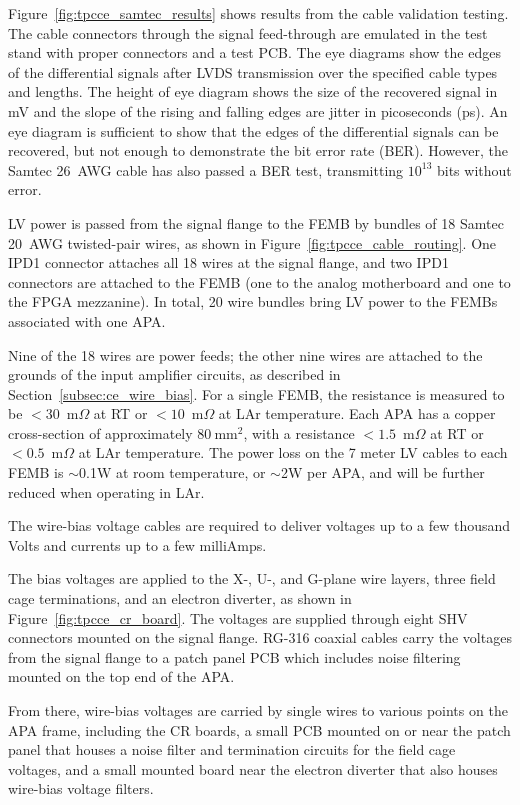 Figure~\ref{fig:tpcce_samtec_results} shows results from the cable 
validation testing. The cable connectors through the signal feed-through are emulated in the test stand with 
proper connectors and a test PCB. The eye diagrams show the edges of the differential signals after 
LVDS transmission over the specified cable types and lengths. The height of eye diagram shows the size 
of the recovered signal in mV and the slope of the rising and falling edges are jitter in picoseconds (ps). 
An eye diagram is sufficient to show that the edges of the differential signals can
be recovered, but not enough to demonstrate the bit error rate (BER). However, the Samtec 26~AWG cable has 
also passed a BER test, transmitting $10^{13}$ bits without error.

LV power is passed from the signal flange to the FEMB by bundles of 18 Samtec 
20~AWG twisted-pair wires, as shown in Figure~\ref{fig:tpcce_cable_routing}. One IPD1 connector
attaches all 18 wires at the signal flange, and two IPD1 connectors are attached to the FEMB (one to the
analog motherboard and one to the FPGA mezzanine). In total, 20 wire bundles 
 bring LV power to the FEMBs associated with one APA.

Nine of the 18 wires are power feeds; the other nine wires
are attached to the grounds of the input amplifier circuits, as described in Section~\ref{subsec:ce_wire_bias}.
For a single FEMB, the resistance is measured to be $<30$~m$\Omega$ at RT or $<10$~m$\Omega$ at 
LAr temperature. Each APA has a copper cross-section of approximately $80~\mathrm{mm}^2$, with a 
resistance $<1.5$~m$\Omega$ at RT or $<0.5$~m$\Omega$ at LAr temperature. The power loss 
on the 7 meter LV cables to each FEMB is $\sim$0.1W at room temperature, or $\sim$2W per APA, and will be 
further reduced when operating in LAr.

The wire-bias voltage cables are required to deliver voltages up to a few thousand Volts and currents up to a few
milliAmps.

The bias voltages are applied to the X-, U-, and G-plane wire layers, three field cage terminations, 
and an electron diverter, as shown in Figure~\ref{fig:tpcce_cr_board}. The voltages are supplied 
through eight SHV connectors mounted on the signal flange. RG-316 coaxial cables carry the voltages 
from the signal flange to a patch panel PCB which includes noise filtering mounted on the top 
end of the APA. 

From there, wire-bias voltages are carried by single wires to 
various points on the APA frame, including the CR boards, a small PCB mounted on or near 
the patch panel that houses a noise filter and termination circuits for the field cage voltages, and 
a small mounted board near the electron diverter that also houses wire-bias voltage filters.


